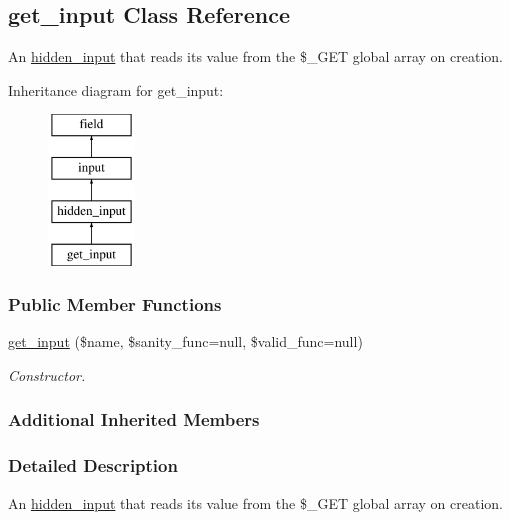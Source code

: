 \hypertarget{classget__input}{\subsection{get\-\_\-input Class Reference}
\label{classget__input}
}


An \hyperlink{classhidden__input}{hidden\-\_\-input} that reads its value from the \$\-\_\-\-G\-E\-T global array on creation.  


Inheritance diagram for get\-\_\-input\-:\begin{figure}[H]
\begin{center}
\leavevmode
\includegraphics[height=4.000000cm]{classget__input}
\end{center}
\end{figure}
\subsubsection*{Public Member Functions}
\begin{DoxyCompactItemize}
\item 
\hyperlink{classget__input_a381a7271f72a0231a6a2c7a20f960410}{get\-\_\-input} (\$name, \$sanity\-\_\-func=null, \$valid\-\_\-func=null)
\begin{DoxyCompactList}\small\item\em Constructor. \end{DoxyCompactList}\end{DoxyCompactItemize}
\subsubsection*{Additional Inherited Members}


\subsubsection{Detailed Description}
An \hyperlink{classhidden__input}{hidden\-\_\-input} that reads its value from the \$\-\_\-\-G\-E\-T global array on creation. 

